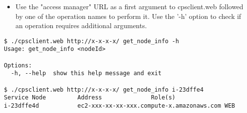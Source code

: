 \documentclass[10pt]{article}
\newenvironment{framedbox}[1]%
{\begin{framed}
 \begingroup
 \fontsize{#1}{#1}\selectfont
}
{
 \endgroup
 \end{framed}
}
\begin{document}
\begin{itemize}
\item Use the "access manager" URL as a first argument to cpsclient.web followed
      by one of the operation names to perform it. Use the '-h' option to check
      if an operation requires additional arguments.
\end{itemize}
\begin{framedbox}{8pt}\begin{verbatim}
$ ./cpsclient.web http://x-x-x-x/ get_node_info -h
Usage: get_node_info <nodeId>

Options:
  -h, --help  show this help message and exit

$ ./cpsclient.web http://x-x-x-x/ get_node_info i-23dffe4
Service Node         Address              Role(s)
i-23dffe4d           ec2-xxx-xx-xx-xxx.compute-x.amazonaws.com WEB
\end{verbatim}\end{framedbox}
\end{document}
